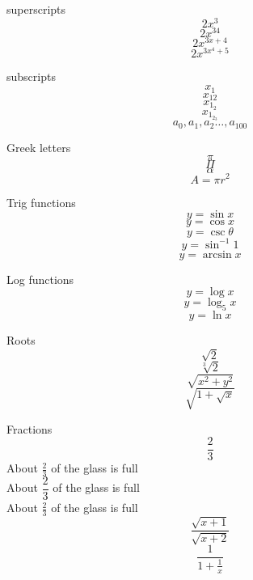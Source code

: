 \documentclass[11pt]{article}
\begin{document}
superscripts 
$$2x^3$$
$$2x^{34}$$
$$2x^{3x+4}$$
$$2x^{3x^4+5}$$


subscripts 
$$x_1$$
$$x_{12}$$
$$x_{1_2}$$
$$x_{1_{2_3}}$$
$$a_0, a_1, a_2 \ldots, a_{100}$$


Greek letters
$$\pi$$
$$\Pi$$
$$\alpha$$
$$A = \pi r^2$$


Trig functions
$$y=\sin x$$
$$y=\cos x$$
$$y=\csc\theta$$
$$y=\sin^{-1}1$$
$$y=\arcsin x$$


Log functions
$$y=\log x$$
$$y=\log_5 x$$
$$y=\ln x$$


Roots
$$\sqrt{2}$$
$$\sqrt[3]{2}$$
$$\sqrt{x^2+y^2}$$
$$\sqrt{1+\sqrt{x}}$$


Fractions
$$\frac{2}{3}$$
About $\displaystyle\frac{2}{3}$ of the glass is full\\[6pt]
About $\dfrac{2}{3}$ of the glass is full\\[6pt]
About $\frac{2}{3}$ of the glass is full\\
$$\frac{\sqrt{x+1}}{\sqrt{x+2}}$$
$$\frac{1}{1+\frac{1}{x}}$$
\end{document}
